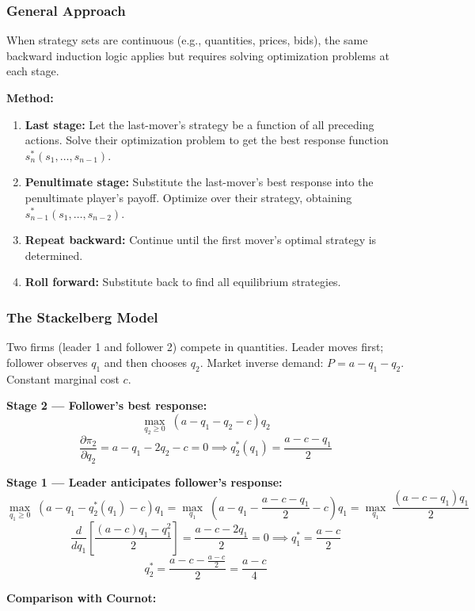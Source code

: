 \documentclass[hidelinks]{article}
\begin{document}
\subsubsection{General Approach}

When strategy sets are continuous (e.g., quantities, prices, bids), the same backward induction logic applies but requires solving optimization problems at each stage.

\textbf{Method:}
\begin{enumerate}
    \item \textbf{Last stage:} Let the last-mover's strategy be a function of all preceding actions. Solve their optimization problem to get the best response function $s_n^*(s_1, \ldots, s_{n-1})$.
    \item \textbf{Penultimate stage:} Substitute the last-mover's best response into the penultimate player's payoff. Optimize over their strategy, obtaining $s_{n-1}^*(s_1, \ldots, s_{n-2})$.
    \item \textbf{Repeat backward:} Continue until the first mover's optimal strategy is determined.
    \item \textbf{Roll forward:} Substitute back to find all equilibrium strategies.
\end{enumerate}

\subsubsection{The Stackelberg Model}

Two firms (leader 1 and follower 2) compete in quantities. Leader moves first; follower observes $q_1$ and then chooses $q_2$. Market inverse demand: $P = a - q_1 - q_2$. Constant marginal cost $c$.

\textbf{Stage 2 — Follower's best response:}
\[
\max_{q_2 \geq 0} \; (a - q_1 - q_2 - c)q_2
\]
\[
\frac{\partial \pi_2}{\partial q_2} = a - q_1 - 2q_2 - c = 0 \implies q_2^*(q_1) = \frac{a - c - q_1}{2}
\]

\textbf{Stage 1 — Leader anticipates follower's response:}
\[
\max_{q_1 \geq 0} \; (a - q_1 - q_2^*(q_1) - c) q_1 = \max_{q_1} \; \left(a - q_1 - \frac{a-c-q_1}{2} - c\right) q_1 = \max_{q_1} \; \frac{(a-c-q_1)q_1}{2}
\]
\[
\frac{d}{dq_1}\left[\frac{(a-c)q_1 - q_1^2}{2}\right] = \frac{a-c-2q_1}{2} = 0 \implies q_1^* = \frac{a-c}{2}
\]
\[
q_2^* = \frac{a-c - \frac{a-c}{2}}{2} = \frac{a-c}{4}
\]

\textbf{Comparison with Cournot:}
\end{document}
